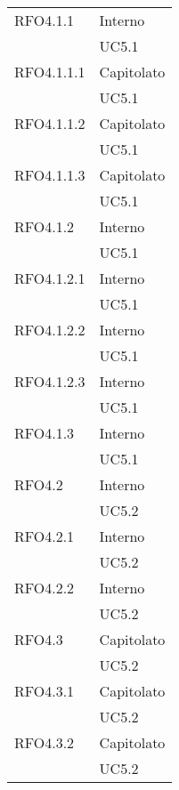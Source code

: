 \begin{center}
\begin{longtable}{ | >{\centering\arraybackslash}m{5cm} | >{\centering\arraybackslash}m{5cm} | }
        RFO4.1.1 & Interno\\
            & UC5.1 \\
\hline

        RFO4.1.1.1 & Capitolato\\
            & UC5.1 \\
\hline

        RFO4.1.1.2 & Capitolato\\
            & UC5.1 \\
\hline

        RFO4.1.1.3 & Capitolato\\
            & UC5.1 \\
\hline

        RFO4.1.2 & Interno\\
            & UC5.1 \\
\hline

        RFO4.1.2.1 & Interno\\
            & UC5.1 \\
\hline

        RFO4.1.2.2 & Interno\\
            & UC5.1 \\
\hline

        RFO4.1.2.3 & Interno\\
            & UC5.1 \\
\hline

        RFO4.1.3 & Interno\\
            & UC5.1 \\
\hline

        RFO4.2 & Interno\\
            & UC5.2 \\
\hline

        RFO4.2.1 & Interno\\
            & UC5.2 \\
\hline

        RFO4.2.2 & Interno\\
            & UC5.2 \\
\hline

        RFO4.3 & Capitolato\\
            & UC5.2 \\
\hline

        RFO4.3.1 & Capitolato\\
            & UC5.2 \\
\hline

        RFO4.3.2 & Capitolato\\
            & UC5.2 \\
\hline


\end{longtable}
\end{center}
